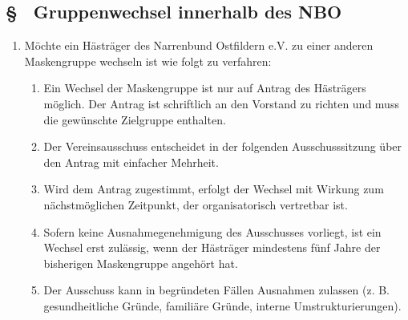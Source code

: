 \subsection{§ \thegoparagraphcounter\ Gruppenwechsel innerhalb des NBO} \label{go:par:gruppenwechsel}
\begin{enumerate}
    \item \label{go:abs:zwvpr7} Möchte ein Hästräger des Narrenbund Ostfildern e.V. zu einer anderen Maskengruppe wechseln ist wie folgt zu verfahren:
    \begin{enumerate}
        \item Ein Wechsel der Maskengruppe ist nur auf Antrag des Hästrägers möglich. Der Antrag ist schriftlich an den Vorstand zu richten und muss die gewünschte Zielgruppe enthalten.
        
        \item Der Vereinsausschuss entscheidet in der folgenden Ausschusssitzung über den Antrag mit einfacher Mehrheit.

        \item Wird dem Antrag zugestimmt, erfolgt der Wechsel mit Wirkung zum nächstmöglichen Zeitpunkt, der organisatorisch vertretbar ist.

        \item Sofern keine Ausnahmegenehmigung des Ausschusses vorliegt, ist ein Wechsel erst zulässig, wenn der Hästräger mindestens fünf Jahre der bisherigen Maskengruppe angehört hat.

        \item Der Ausschuss kann in begründeten Fällen Ausnahmen zulassen (z. B. gesundheitliche Gründe, familiäre Gründe, interne Umstrukturierungen).
    \end{enumerate}
\end{enumerate}

